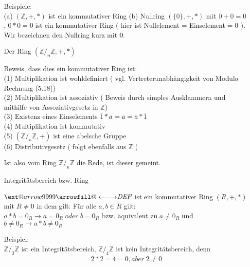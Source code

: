 \documentclass[smallheadings,12pt,a4paper]{scrartcl}
\makeatletter
\newcommand\xleftrightarrow[2][]{%
  \ext@arrow 9999{\longleftrightarrowfill@}{#1}{#2}}
\newcommand\longleftrightarrowfill@{%
  \arrowfill@\leftarrow\relbar\rightarrow}
\makeatother
\begin{document}
\item Beispiele: \\
(a) $ (\mathbb{Z},+,*) $ ist ein kommutativer Ring 
(b) Nullring $ ( \{0\}, +, * ) $ mit $0+0 = 0$ ,  $0*0=0$ ist ein kommutativer Ring ( hier ist Nullelement = Einselement = 0 ). Wir bezeichnen den Nullring kurz mit 0.

\begin{center}
\item[ Der Ring $ ( \mathbb{Z}/_n \mathbb{Z} , +, * ) $]
\end{center}
\item Beweis, dass dies ein kommutativer Ring ist:\\
(1) Multiplikation ist wohldefiniert ( vgl. Vertreterunabhängigkeit von Modulo Rechnung (5.18)) \\
(2) Multiplikation ist assoziativ ( Beweis durch simples Ausklammern und mithilfe von Assoziativgesetz in $\mathbb{Z}$) \\
(3) Existenz eines Einselements $ \overline{1} * \overline{a} = \overline{a} =  \overline{a} * \overline{1} $\\
(4) Multiplikation ist kommutativ \\
(5)  $ ( \mathbb{Z}/_n \mathbb{Z} , + ) $ ist eine abelsche Gruppe \\
(6) Distributivgesetz ( folgt ebenfalls aus $\mathbb{Z}$ ) \\
\item Ist also vom Ring $ \mathbb{Z}/_n \mathbb{Z} $ die Rede, ist dieser gemeint.

\begin{center}
\item[ Integritätsbereich bzw. Ring ]
\end{center}
\item $\xleftrightarrow{\textit{DEF}}$ ist ein kommutativer Ring $(R,+,*)$ mit $R\neq 0$ in dem gilt: Für alle $a,b \in R $ gilt: \\
$a*b = 0_R \rightarrow a = 0_R \; \textit{oder} \;   b = 0_R $ bzw. äquivalent zu $ a \neq 0_R $ und $ b \neq 0_R \rightarrow a*b \neq 0_R $ \\
\item Beispiel: \\
$ \mathbb{Z}/_3 \mathbb{Z} $ ist ein Integritätsbereich,  $ \mathbb{Z}/_4 \mathbb{Z} $ ist kein Integritätsbereich, denn \\
$$ \overline{2} * \overline{2} = \overline{4} = \overline{0} , \textit{aber} \; \overline{2} \neq \overline{0} $$ 
\end{document}
